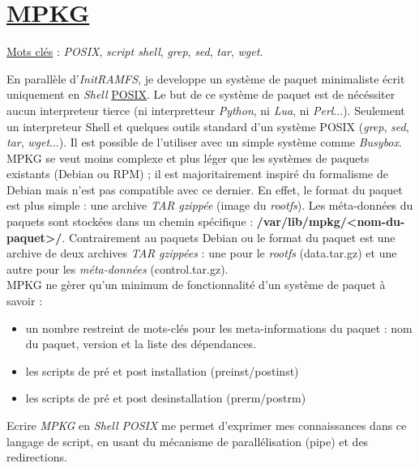 \documentclass[a4paper]{article}
\begin{document}
\section{\href{https://github.com/gazoo74/mpkg/}{MPKG}}

\underline{Mots clés} : \textit{POSIX}, \textit{script shell}, \textit{grep}, \textit{sed}, \textit{tar}, \textit{wget}.

En parallèle d'\textit{InitRAMFS}, je developpe un système de paquet minimaliste écrit uniquement en \textit{Shell} \href{https://fr.wikipedia.org/wiki/POSIX}{POSIX}. Le but de ce système de paquet est de nécéssiter aucun interpreteur tierce (ni interpretteur \textit{Python}, ni \textit{Lua}, ni \textit{Perl}...). Seulement un interpreteur Shell et quelques outils standard d'un système POSIX (\textit{grep}, \textit{sed}, \textit{tar}, \textit{wget}...). Il est possible de l'utiliser avec un simple système comme \textit{Busybox}.\\

MPKG se veut moins complexe et plus léger que les systèmes de paquets existants (Debian ou RPM) ; il est majoritairement inspiré du formalisme de Debian mais n'est pas compatible avec ce dernier. En effet, le format du paquet est plus simple : une archive \textit{TAR} \textit{gzippée} (image du \textit{rootfs}). Les méta-données du paquets sont stockées dans un chemin spécifique : \textbf{/var/lib/mpkg/<nom-du-paquet>/}.
Contrairement au paquets Debian ou le format du paquet est une archive de deux archives \textit{TAR} \textit{gzippées} : une pour le \textit{rootfs} (data.tar.gz) et une autre pour les \textit{méta-données} (control.tar.gz).\\

MPKG ne gèrer qu'un minimum de fonctionnalité d'un système de paquet à savoir :
\begin{itemize}
\item un nombre restreint de mots-clés pour les meta-informations du paquet : nom du paquet, version et la liste des dépendances.
\item les scripts de pré et post installation (preinst/postinst)
\item les scripts de pré et post desinstallation (prerm/postrm)
\end{itemize}

Ecrire \textit{MPKG} en \textit{Shell POSIX} me permet d'exprimer mes connaissances dans ce langage de script, en usant du mécanisme de parallélisation (pipe) et des redirections.
\clearpage
\end{document}
